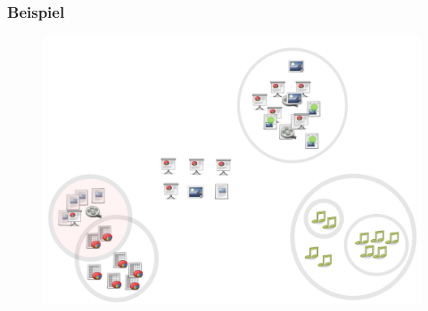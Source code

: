 \begin{frame}

\frametitle{Beispiel}
\label{beispiel}

\begin{figure}[htbp]
\centering
\includegraphics[keepaspectratio,width=\textwidth,height=0.75\textheight]{03.png}
\label{}
\end{figure}


\end{frame}

